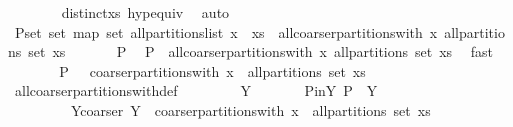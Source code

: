 \begin{isabellebody}
\ \ \ \ \ \ \isamarkupfalse%
\ distinct{\isacharunderscore}xs\ hyp{\isacharunderscore}equiv\ \isamarkupfalse%
\ auto\isanewline
\ \ \ \ \isamarkupfalse%
\ \isamarkupfalse%
\ P{\isacharunderscore}set{\isacharcolon}\ {\isachardoublequoteopen}set\ {\isacharparenleft}map\ set\ {\isacharparenleft}all{\isacharunderscore}partitions{\isacharunderscore}list\ {\isacharparenleft}x\ {\isacharhash}\ xs{\isacharparenright}{\isacharparenright}{\isacharparenright}\ {\isacharequal}\ all{\isacharunderscore}coarser{\isacharunderscore}partitions{\isacharunderscore}with\ x\ {\isacharparenleft}all{\isacharunderscore}partitions\ {\isacharparenleft}set\ xs{\isacharparenright}{\isacharparenright}{\isachardoublequoteclose}\ \isacommand{{\isachardot}}\isamarkupfalse%
\isanewline
\isanewline
\ \ \ \ \isamarkupfalse%
\ P\ \isamarkupfalse%
\ {\isachardoublequoteopen}P\ {\isasymin}\ all{\isacharunderscore}coarser{\isacharunderscore}partitions{\isacharunderscore}with\ x\ {\isacharparenleft}all{\isacharunderscore}partitions\ {\isacharparenleft}set\ xs{\isacharparenright}{\isacharparenright}{\isachardoublequoteclose}\ \isamarkupfalse%
\ fast\isanewline
\ \ \ \ \isamarkupfalse%
\ \isamarkupfalse%
\ {\isachardoublequoteopen}P\ {\isasymin}\ {\isasymUnion}\ {\isacharparenleft}coarser{\isacharunderscore}partitions{\isacharunderscore}with\ x\ {\isacharbackquote}\ {\isacharparenleft}all{\isacharunderscore}partitions\ {\isacharparenleft}set\ xs{\isacharparenright}{\isacharparenright}{\isacharparenright}{\isachardoublequoteclose}\isanewline
\ \ \ \ \ \ \isamarkupfalse%
\ all{\isacharunderscore}coarser{\isacharunderscore}partitions{\isacharunderscore}with{\isacharunderscore}def\ \isacommand{{\isachardot}}\isamarkupfalse%
\isanewline
\ \ \ \ \isamarkupfalse%
\ \isamarkupfalse%
\ Y\isanewline
\ \ \ \ \ \ \ P{\isacharunderscore}in{\isacharunderscore}Y{\isacharcolon}\ {\isachardoublequoteopen}P\ {\isasymin}\ Y{\isachardoublequoteclose}\isanewline
\ \ \ \ \ \ \ \ \ Y{\isacharunderscore}coarser{\isacharcolon}\ {\isachardoublequoteopen}Y\ {\isasymin}\ coarser{\isacharunderscore}partitions{\isacharunderscore}with\ x\ {\isacharbackquote}\ {\isacharparenleft}all{\isacharunderscore}partitions\ {\isacharparenleft}set\ xs{\isacharparenright}{\isacharparenright}{\isachardoublequoteclose}\ \isacommand{{\isachardot}{\isachardot}}\isamarkupfalse%
\isanewline
\ \ \ \ \isamarkupfalse%

\end{isabellebody}
